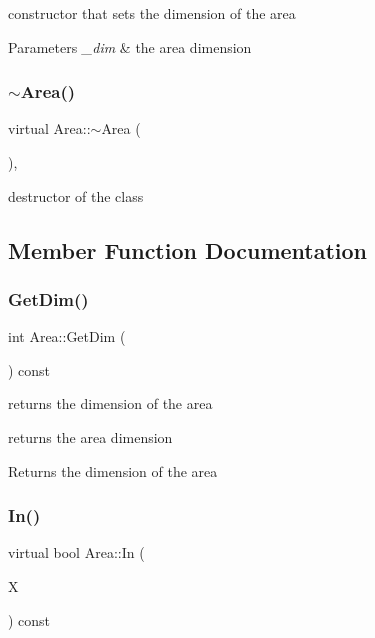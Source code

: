 constructor that sets the dimension of the area 
\begin{DoxyParams}{Parameters}
{\em \+\_\+dim} & the area dimension \\
\hline
\end{DoxyParams}
\mbox{\label{class_area_a5ed5a9705b2715f347b764894c5015f0}} 
\subsubsection{\texorpdfstring{$\sim$\+Area()}{~Area()}}
{\footnotesize\ttfamily virtual Area\+::$\sim$\+Area (\begin{DoxyParamCaption}{ }\end{DoxyParamCaption})\hspace{0.3cm}{\ttfamily [inline]}, {\ttfamily [virtual]}}

destructor of the class 

\subsection{Member Function Documentation}
\mbox{\label{class_area_a4a7d5f99dd276ecc047fe75f448432ec}} 
\subsubsection{\texorpdfstring{Get\+Dim()}{GetDim()}}
{\footnotesize\ttfamily int Area\+::\+Get\+Dim (\begin{DoxyParamCaption}{ }\end{DoxyParamCaption}) const\hspace{0.3cm}{\ttfamily [inline]}}



returns the dimension of the area 

returns the area dimension \begin{DoxyReturn}{Returns}
the dimension of the area 
\end{DoxyReturn}
\mbox{\label{class_area_a08775973fcf205fb91654b25a08f6bea}} 
\subsubsection{\texorpdfstring{In()}{In()}}
{\footnotesize\ttfamily virtual bool Area\+::\+In (\begin{DoxyParamCaption}\item[{const \hyperlink{classv_point}{v\+Point} \&}]{X }\end{DoxyParamCaption}) const\hspace{0.3cm}{\ttfamily [pure virtual]}}

